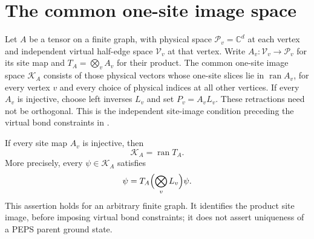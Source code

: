 \section{The common one-site image space}%
\label{sec:peps_vertex_image_ground_space}

\begin{definition}%
    \label{def:peps_vertex_image_ground_space}
    \leanok
    Let $A$ be a tensor on a finite graph, with physical space
    $\mathcal P_v=\mathbb C^d$ at each vertex and independent virtual
    half-edge space $\mathcal V_v$ at that vertex.
    Write $A_v:\mathcal V_v\to\mathcal P_v$ for its site map and
    $T_A=\bigotimes_v A_v$ for their product.
    The common one-site image space $\mathcal K_A$ consists of those
    physical vectors whose one-site slices lie in
    $\operatorname{ran}A_v$, for every vertex $v$ and every choice of
    physical indices at all other vertices.
    If every $A_v$ is injective, choose left inverses $L_v$ and set
    $P_v=A_vL_v$. These retractions need not be orthogonal.
    This is the independent site-image condition preceding the
    virtual bond constraints in
    \cite[Section~IV.C.1]{Cirac2021Matrix}.
\end{definition}

\begin{lemma}%
    \label{thm:peps_vertex_image_ground_space}
    \leanok
    If every site map $A_v$ is injective, then
    \[
        \mathcal K_A=\operatorname{ran}T_A.
    \]
    More precisely, every $\psi\in\mathcal K_A$ satisfies
    \[
        \psi=T_A\Bigl(\bigotimes_v L_v\Bigr)\psi.
    \]
    This assertion holds for an arbitrary finite graph. It identifies
    the product site image, before imposing virtual bond constraints;
    it does not assert uniqueness of a PEPS parent ground state.
\end{lemma}

